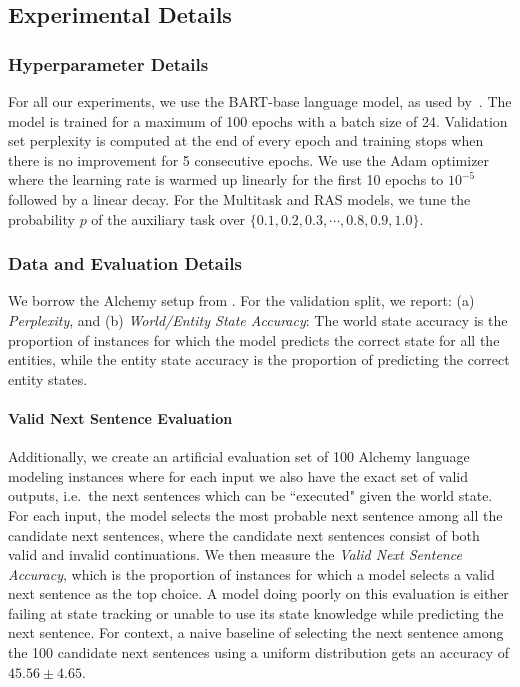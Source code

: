 \documentclass[12pt]{thesis-umich}[thesis]
\begin{document}
\subsection{Experimental Details}
\subsubsection{Hyperparameter Details}
For all our experiments, we use the BART-base language model, as used by~\citet{li-etal-2021-implicit}.  
The model is trained for a maximum of 100 epochs with a batch size of 24.
 Validation set perplexity is computed at the end of every epoch and training stops when there is no improvement for 5 consecutive epochs. 
We use the Adam optimizer where the learning rate is warmed up linearly for the first 10 epochs to $10^{-5}$ followed by a linear decay. For the Multitask and RAS models, we tune the probability $p$ of the auxiliary task over $\{0.1, 0.2, 0.3, \cdots, 0.8, 0.9, 1.0\}$. 


\subsubsection{Data and Evaluation Details} We borrow the Alchemy setup from \citet{li-etal-2021-implicit}. For the validation split, we report: (a) \emph{Perplexity}, and (b) \emph{World/Entity State Accuracy}: The world state accuracy is the proportion of instances for which the model predicts the correct state for all the entities, while the entity state accuracy is the proportion of predicting the correct entity states. 

\paragraph{Valid Next Sentence Evaluation}
Additionally, we create an artificial evaluation set of 100 Alchemy language modeling instances where for each input we also have the exact set of valid outputs, i.e.\ the next sentences which can be ``executed" given the world state. For each input, the model selects the most probable next sentence among all the candidate next sentences, where the candidate next sentences consist of both valid and invalid continuations. 
We then measure the \emph{Valid Next Sentence Accuracy}, which is the proportion of instances for which a model selects a valid next sentence as the top choice.  
A model doing poorly on this evaluation is either failing at state tracking or unable to use its state knowledge while predicting the next sentence. 
For context, a naive baseline of selecting the next sentence among the 100 candidate next sentences using a uniform distribution gets an accuracy of $45.56 \pm 4.65$. 
\end{document}
